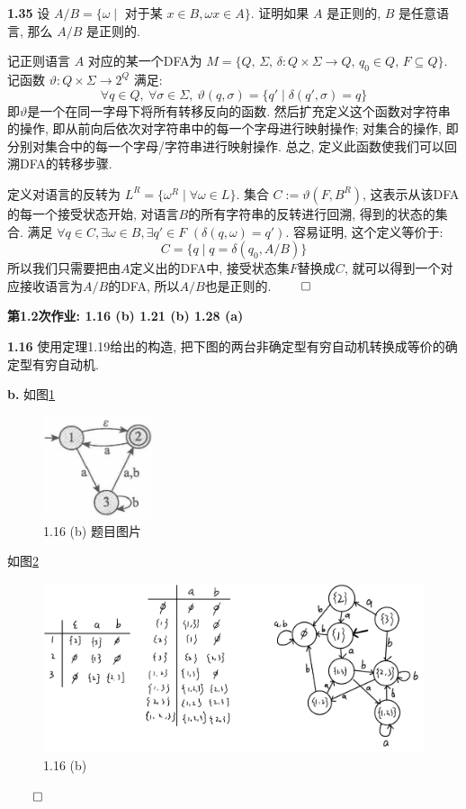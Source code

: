 \documentclass[UTF8]{report}
\newcommand{\problem}[1]{{\setlength{\parskip}{10pt}\noindent \bf{#1}}}
\renewenvironment{proof}{{\setlength{\parskip}{7pt}\noindent\hskip 2em \bf 证明 \quad}}{\hfill$\qed$\par}
\begin{document}
\problem{1.35} 设 $A/B = \{ \omega\mid\text{ 对于某 }x\in B, \omega x\in A \}$. 证明如果 $A$ 是正则的, $B$ 是任意语言, 那么 $A/B$ 是正则的.

\begin{proof}
    记正则语言 $A$ 对应的某一个DFA为 $M = \{ Q,\,\Sigma,\,\delta:Q\times\Sigma\rightarrow Q,\,q_0\in Q,\,F\subseteq Q \}$. 记函数 $\vartheta: Q\times\Sigma \rightarrow 2^Q$ 满足:
    \[
        \forall q \in Q,\ \forall \sigma \in \Sigma,\ \vartheta(q, \sigma) = \{q'\mid \delta(q', \sigma) = q\}
    \]
    即$\vartheta$是一个在同一字母下将所有转移反向的函数. 然后扩充定义这个函数对字符串的操作, 即从前向后依次对字符串中的每一个字母进行映射操作; 对集合的操作, 即分别对集合中的每一个字母/字符串进行映射操作. 总之, 定义此函数使我们可以回溯DFA的转移步骤.

    定义对语言的反转为 $L^R = \{\omega^R \mid \forall\omega\in L\}$. 集合 $C := \vartheta(F, B^R)$, 这表示从该DFA的每一个接受状态开始, 对语言$B$的所有字符串的反转进行回溯, 得到的状态的集合. 满足 $\forall q\in C, \exists \omega\in B, \exists q'\in F\,\,(\delta(q,\omega) = q')$. 容易证明, 这个定义等价于:
    \[
        C = \{ q\mid q = \delta(q_0, A/B) \}
    \]
    所以我们只需要把由$A$定义出的DFA中, 接受状态集$F$替换成$C$, 就可以得到一个对应接收语言为$A/B$的DFA, 所以$A/B$也是正则的. 
\end{proof}




\textbf{第1.2次作业: 1.16 (b) 1.21 (b) 1.28 (a)}

\problem{1.16} 使用定理1.19给出的构造, 把下图的两台非确定型有穷自动机转换成等价的确定型有穷自动机.

\problem{b.} 如图\ref{fig:1_16b}

\begin{figure}[!htbp]
    \centering
    \includegraphics[height=3cm]{image/1.16 b.png}
    \caption{1.16 (b) 题目图片}
    \label{fig:1_16b}
\end{figure}

\begin{proof}
    如图\ref{fig:1_16}

    \begin{figure}[!htbp]
        \centering
        \includegraphics[height=5cm]{image/1.16.png}
        \caption{1.16 (b)}
        \label{fig:1_16}
    \end{figure}
\end{proof}
\end{document}

